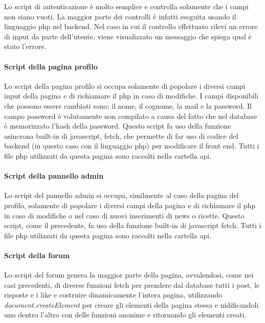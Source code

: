 Lo script di autenticazione è molto semplice e controlla solamente che i campi non siano vuoti. La maggior parte dei controlli è infatti eseguita usando il linguaggio php nel backend. Nel caso in cui il controllo effettuato rilevi un errore di input da parte dell'utente, viene visualizzato un messaggio che spiega qual è stato l'errore. 

\paragraph{Script della pagina profilo}

Lo script della pagina profilo si occupa solamente di popolare i diversi campi input della pagina e di richiamare il php in caso di modifiche. I campi disponibili che possono essere cambiati sono: il nome, il cognome, la mail e la password. Il campo password è volutamente non compilato a causa 
del fatto che nel database è memorizzato l'hash della password. Questo script fa uso della funzione asincrona built-in di javascript, fetch, che permette di far uso di codice del backend (in questo caso con il linguaggio php) per modificare il 
front end. Tutti i file php utilizzati da questa pagina sono raccolti nella cartella api.

\paragraph{Script della pannello admin}

Lo script del pannello admin si occupa, similmente al caso della pagina del profilo, solamente di popolare i diversi campi della pagina e di richiamare il php in caso di modifiche o nel caso di nuovi inserimenti di news o ricette. 
Questo script, come il precedente, fa uso della funzione built-in di javascript fetch. 
Tutti i file php utilizzati da questa pagina sono raccolti nella cartella api.

\paragraph{Script della forum}

Lo script del forum genera la maggior parte della pagina, avvalendosi, come nei casi precedenti, di diverse funzioni fetch per prendere dal database tutti i post, le risposte e i like e costruire dinamicamente l'intera pagina, utilizzando 
\textit{document.createElement} per creare gli elementi della pagina stessa e nidificandoli uno dentro l'altro con delle funzioni anonime e ritornando gli elementi creati. 




